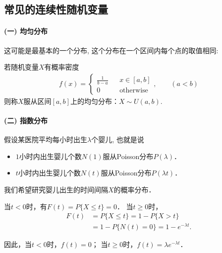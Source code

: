       \subsection{常见的连续性随机变量}

      \paragraph{(一) 均匀分布}

      这可能是最基本的一个分布, 这个分布在一个区间内每个点的取值相同: 

      \begin{definition}
        若随机变量$X$有概率密度
        \begin{align*}
        f(x)=\left\{\begin{array}{lcl}
        \frac1{b-a} & & x\in [a,b] \\
        0 & & \mbox{otherwise}
        \end{array}\right. ,\qquad (a<b)
        \end{align*}
        则称$X$服从区间$[a,b]$上的均匀分布：$X\sim U(a,b)$.
        \end{definition}%

    
        \paragraph{(二) 指数分布}
      
        假设某医院平均每小时出生$\lambda$个婴儿, 也就是说
\begin{itemize}
  \item $1$小时内出生婴儿个数$N(1)$服从Poisson分布$P(\lambda)$．
  \item $t$小时内出生婴儿个数$N(t)$服从Poisson分布$P(\lambda t)$．
\end{itemize}
我们希望研究婴儿出生的时间间隔$X$的概率分布．


当$t<0$时，有$F(t)=P\{X\le t\}=0$． 当$t\ge0$时，
\begin{align*}
 F(t)&=P\{X\le t\}=1-P\{X>t\}\\
 &=1-P\{N(t)=0\}=1-e^{-\lambda t}.
\end{align*}

因此，当$t<0$时，$f(t)=0$； 当$t\ge0$时，$f(t)=\lambda e^{-\lambda t}$．

